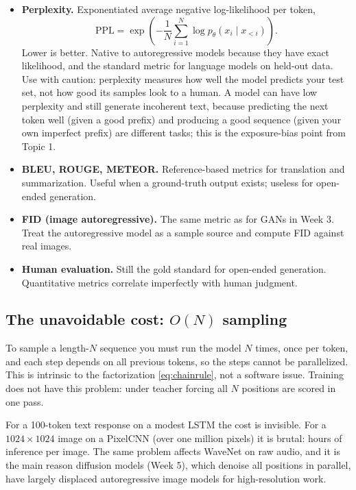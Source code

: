 \documentclass[11pt]{article}
\theoremstyle{remark}
\begin{document}
\begin{itemize}
\item \textbf{Perplexity.} Exponentiated average negative log-likelihood per token,
\begin{equation}
\mathrm{PPL} = \exp\!\left(-\frac{1}{N} \sum_{i=1}^{N} \log p_\theta(x_i \mid x_{<i})\right).
\end{equation}
Lower is better. Native to autoregressive models because they have exact likelihood, and the standard metric for language models on held-out data. Use with caution: perplexity measures how well the model predicts your test set, not how good its samples look to a human. A model can have low perplexity and still generate incoherent text, because predicting the next token well (given a good prefix) and producing a good sequence (given your own imperfect prefix) are different tasks; this is the exposure-bias point from Topic 1.
\item \textbf{BLEU, ROUGE, METEOR.} Reference-based metrics for translation and summarization. Useful when a ground-truth output exists; useless for open-ended generation.
\item \textbf{FID (image autoregressive).} The same metric as for GANs in Week 3. Treat the autoregressive model as a sample source and compute FID against real images.
\item \textbf{Human evaluation.} Still the gold standard for open-ended generation. Quantitative metrics correlate imperfectly with human judgment.
\end{itemize}

\subsection{The unavoidable cost: $O(N)$ sampling}

To sample a length-$N$ sequence you must run the model $N$ times, once per token, and each step depends on all previous tokens, so the steps cannot be parallelized. This is intrinsic to the factorization \eqref{eq:chainrule}, not a software issue. Training does not have this problem: under teacher forcing all $N$ positions are scored in one pass.

For a 100-token text response on a modest LSTM the cost is invisible. For a $1024 \times 1024$ image on a PixelCNN (over one million pixels) it is brutal: hours of inference per image. The same problem affects WaveNet on raw audio, and it is the main reason diffusion models (Week 5), which denoise all positions in parallel, have largely displaced autoregressive image models for high-resolution work.
\end{document}
